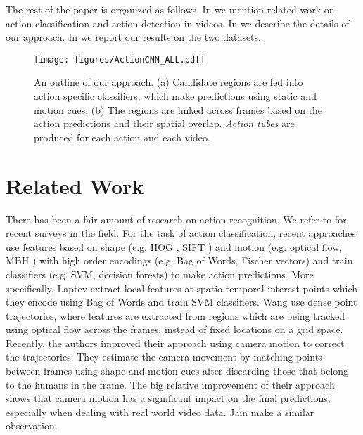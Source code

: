 \documentclass[10pt,twocolumn,letterpaper]{article}
\begin{document}
The rest of the paper is organized as follows. In  we mention related work on action classification and action detection in videos. In  we describe the details of our approach. In  we report our results on the two datasets.

\begin{figure*}[t]
\begin{center}
  \texttt{[image: figures/ActionCNN\_ALL.pdf]}
\end{center}
   \caption{An outline of our approach. (a) Candidate regions are fed into action specific classifiers, which make predictions using static and motion cues. (b) The regions are linked across frames based on the action predictions and their spatial overlap. \textit{Action tubes} are produced for each action and each video.}
\end{figure*}
 \section{Related Work}

There has been a fair amount of research on action recognition. We refer to \cite{AggarwalActivity,PoppeSurvey,WeinlandSurvey} for recent surveys in the field. For the task of action classification, recent approaches use features based on shape (e.g. HOG \cite{Dalal05}, SIFT \cite{SIFT}) and motion (e.g. optical flow, MBH \cite{Dalal2006}) with high order encodings (e.g. Bag of Words, Fischer vectors) and train classifiers (e.g. SVM, decision forests)  to make action predictions. More specifically, Laptev \etal \cite{LMSR08} extract local features at spatio-temporal interest points which they encode using Bag of Words and train SVM classifiers. Wang \etal \cite{wang2011} use dense point trajectories, where features are extracted from regions which are being tracked using optical flow across the frames, instead of fixed locations on a grid space. Recently, the authors improved their approach \cite{wang2013} using camera motion to correct the trajectories. They estimate the camera movement by matching points between frames using shape and motion cues after discarding those that belong to the humans in the frame. The big relative improvement of their approach shows that camera motion has a significant impact on the final predictions, especially when dealing with real world video data. Jain \etal \cite{Jain2013} make a similar observation.
\end{document}
